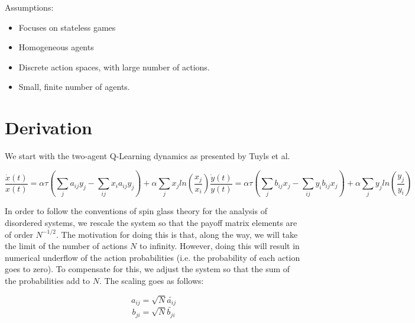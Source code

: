 \documentclass{article}
\begin{document}
	Assumptions:

	\begin{itemize}
		\item Focuses on stateless games
		\item Homogeneous agents
		\item Discrete action spaces, with large number of actions.
		\item Small, finite number of agents.
	\end{itemize}
	



	\section{Derivation} %
	\label{sec:derivation}
	
	We start with the two-agent Q-Learning dynamics as presented by Tuyls et al.

	\begin{subequations}
		\begin{equation}
			\frac{\dot{x}(t)}{x(t)} = \alpha \tau (\sum_{j} a_{ij} y_j - \sum_{i j} x_i a_{ij} y_j)
			+ \alpha \sum_j x_j ln(\frac{x_j}{x_i}) 
		\end{equation}
		\begin{equation}
			\frac{\dot{y}(t)}{y(t)} = \alpha \tau (\sum_{j} b_{ij} x_j - \sum_{i j} y_i b_{ij} x_j)
			+ \alpha \sum_j y_j ln(\frac{y_j}{y_i})
		\end{equation}
	\end{subequations}

	In order to follow the conventions of spin glass theory for the analysis of disordered systems,
	we rescale the system so that the payoff matrix elements are of order $N^{-1/2}$. The motivation
	for doing this is that, along the way, we will take the limit of the number of actions $N$ to
	infinity. However, doing this will result in numerical underflow of the action probabilities 
	(i.e. the probability of each action goes to zero). To compensate for this, we adjust the
	system so that the sum of the probabilities add to $N$. The scaling goes as follows:

	\begin{subequations*}
		\begin{equation*}
			a_{ij} = \sqrt{N} \tilde{a_{ij}}
		\end{equation*}
		\begin{equation*}
			b_{ji} = \sqrt{N} \tilde{b_{ji}}
		\end{equation*}
	\end{subequations*}
\end{document}
